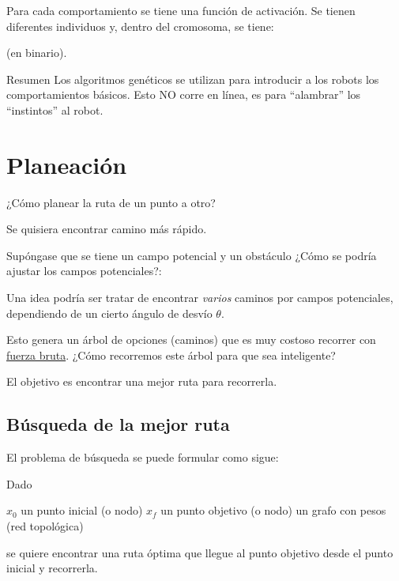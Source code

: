 Para cada comportamiento se tiene una función de activación. Se tienen diferentes individuos y, dentro
del cromosoma, se tiene:



(en binario).

\begin{scaja}
	Resumen
	Los algoritmos genéticos se utilizan para introducir a los robots los comportamientos básicos. Esto NO corre
	en línea, es para “alambrar” los “instintos” al robot. 
\end{scaja}

\section{Planeación}

¿Cómo planear la ruta de un punto a otro? 


Se quisiera encontrar camino más rápido.

Supóngase que se tiene un campo potencial y un obstáculo
¿Cómo se podría ajustar los campos potenciales?:


Una idea podría ser tratar de encontrar \textit{varios} caminos por campos potenciales, dependiendo de un cierto
ángulo de desvío $\theta$.

Esto genera un árbol de opciones (caminos) que es muy costoso recorrer con \underline{fuerza bruta}. ¿Cómo recorremos
este árbol para que sea inteligente?

El objetivo es encontrar una mejor ruta para recorrerla. 

\subsection{Búsqueda de la mejor ruta}

El problema de búsqueda se puede formular como sigue:
 
\begin{scaja}
	Dado
	
	$x_0$ un punto inicial (o nodo)
	$x_f$ un punto objetivo (o nodo)
	un grafo con pesos (red topológica)
	
	se quiere encontrar una ruta óptima que llegue al punto objetivo desde el punto inicial y recorrerla.

\end{scaja} 

\begin{ejemplo}
	
\end{ejemplo}


